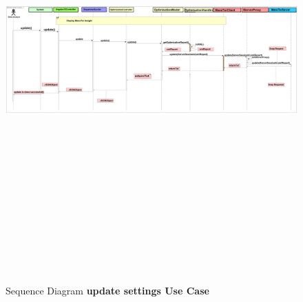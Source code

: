 	\begin{figure}[h]
		\centering
		\includegraphics[width=17.5cm,height=17cm]{SequenceDiagramUpdateSettings.png}
		\caption{Sequence Diagram \textbf{update settings Use Case}}
	\end{figure}

	
	\pagebreak
	\clearpage
	\newpage
	
